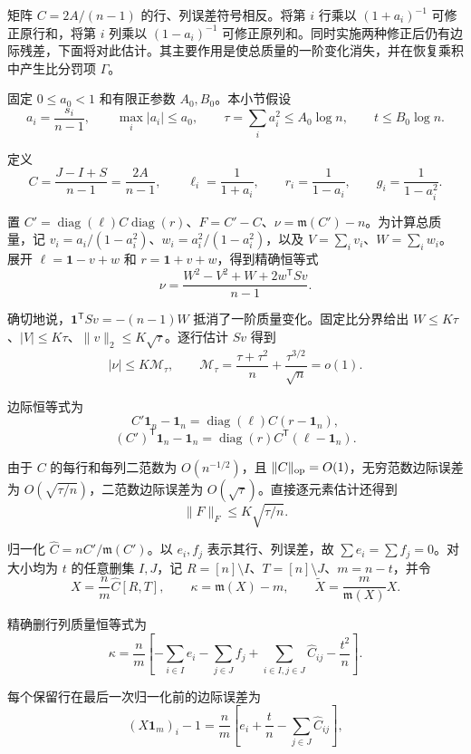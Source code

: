 \documentclass[11pt,a4paper]{article}
\begin{document}
矩阵 \(C=2A/(n-1)\) 的行、列误差符号相反。将第 \(i\) 行乘以 \((1+a_i)^{-1}\) 可修正原行和，将第 \(i\) 列乘以 \((1-a_i)^{-1}\) 可修正原列和。同时实施两种修正后仍有边际残差，下面将对此估计。其主要作用是使总质量的一阶变化消失，并在恢复乘积中产生比分罚项 \(\Gamma\)。

固定 \(0\le a_0<1\) 和有限正参数 \(A_0,B_0\)。本小节假设
\[a_i=\frac{s_i}{n-1},\qquad \max_i|a_i|\le a_0,\qquad \tau=\sum_i a_i^2\le A_0\log n,\qquad t\le B_0\log n.\]

定义
\[C=\frac{J-I+S}{n-1}=\frac{2A}{n-1},\qquad \ell_i=\frac1{1+a_i},\qquad r_i=\frac1{1-a_i},\qquad g_i=\frac1{1-a_i^2}.\]

置 \(C'=\operatorname{diag}(\ell)C\operatorname{diag}(r)\)、\(F=C'-C\)、\(\nu=\mathfrak m(C')-n\)。为计算总质量，记 \(v_i=a_i/(1-a_i^2)\)、\(w_i=a_i^2/(1-a_i^2)\)，以及 \(V=\sum_i v_i\)、\(W=\sum_i w_i\)。展开 \(\ell=\mathbf 1-v+w\) 和 \(r=\mathbf 1+v+w\)，得到精确恒等式
\[\nu=\frac{W^2-V^2+W+2w^{\mathsf T}Sv}{n-1}.\]

确切地说，\(\mathbf 1^{\mathsf T}Sv=-(n-1)W\) 抵消了一阶质量变化。固定比分界给出 \(W\le K\tau\)、\(|V|\le K\tau\)、\(\|v\|_2\le K\sqrt\tau\)。逐行估计 \(Sv\) 得到
\[|\nu|\le K\mathcal M_\tau,\qquad \mathcal M_\tau=\frac{\tau+\tau^2}{n}+\frac{\tau^{3/2}}{\sqrt n}=o(1).\]

边际恒等式为
\[C'\mathbf 1_n-\mathbf 1_n=\operatorname{diag}(\ell)C(r-\mathbf 1_n),\]
\nopagebreak[3]\[(C')^{\mathsf T}\mathbf 1_n-\mathbf 1_n=\operatorname{diag}(r)C^{\mathsf T}(\ell-\mathbf 1_n).\]

由于 \(C\) 的每行和每列二范数为 \(O(n^{-1/2})\)，且 \(\|C\|_{\rm op}=O(1)\)，无穷范数边际误差为 \(O(\sqrt{\tau/n})\)，二范数边际误差为 \(O(\sqrt\tau)\)。直接逐元素估计还得到
\[\|F\|_F\le K\sqrt{\tau/n}.\]

归一化 \(\widehat C=nC'/\mathfrak m(C')\)。以 \(e_i,f_j\) 表示其行、列误差，故 \(\sum e_i=\sum f_j=0\)。对大小均为 \(t\) 的任意删集 \(I,J\)，记 \(R=[n]\setminus I\)、\(T=[n]\setminus J\)、\(m=n-t\)，并令
\[X=\frac n m\widehat C[R,T],\qquad \kappa=\mathfrak m(X)-m,\qquad \widetilde X=\frac m{\mathfrak m(X)}X.\]

精确删行列质量恒等式为
\begin{equation}
\kappa=\frac n m\left[-\sum_{i\in I}e_i-\sum_{j\in J}f_j+\sum_{i\in I,j\in J}\widehat C_{ij}-\frac{t^2}{n}\right].
\tag{6.1}\label{eq-deletion-mass}
\end{equation}

每个保留行在最后一次归一化前的边际误差为
\[(X\mathbf 1_m)_i-1=\frac n m\left[e_i+\frac t n-\sum_{j\in J}\widehat C_{ij}\right],\]
\end{document}
